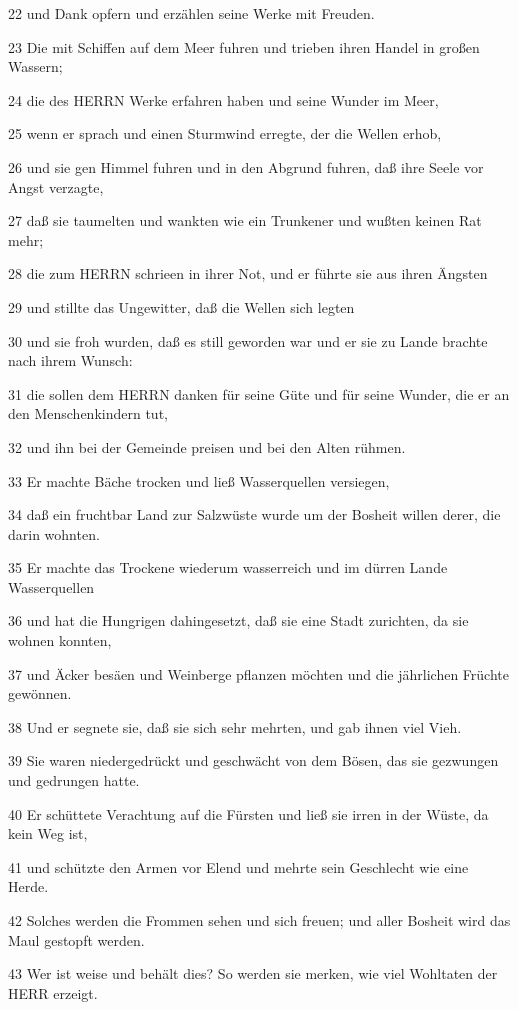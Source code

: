 \par 22 und Dank opfern und erzählen seine Werke mit Freuden.
\par 23 Die mit Schiffen auf dem Meer fuhren und trieben ihren Handel in großen Wassern;
\par 24 die des HERRN Werke erfahren haben und seine Wunder im Meer,
\par 25 wenn er sprach und einen Sturmwind erregte, der die Wellen erhob,
\par 26 und sie gen Himmel fuhren und in den Abgrund fuhren, daß ihre Seele vor Angst verzagte,
\par 27 daß sie taumelten und wankten wie ein Trunkener und wußten keinen Rat mehr;
\par 28 die zum HERRN schrieen in ihrer Not, und er führte sie aus ihren Ängsten
\par 29 und stillte das Ungewitter, daß die Wellen sich legten
\par 30 und sie froh wurden, daß es still geworden war und er sie zu Lande brachte nach ihrem Wunsch:
\par 31 die sollen dem HERRN danken für seine Güte und für seine Wunder, die er an den Menschenkindern tut,
\par 32 und ihn bei der Gemeinde preisen und bei den Alten rühmen.
\par 33 Er machte Bäche trocken und ließ Wasserquellen versiegen,
\par 34 daß ein fruchtbar Land zur Salzwüste wurde um der Bosheit willen derer, die darin wohnten.
\par 35 Er machte das Trockene wiederum wasserreich und im dürren Lande Wasserquellen
\par 36 und hat die Hungrigen dahingesetzt, daß sie eine Stadt zurichten, da sie wohnen konnten,
\par 37 und Äcker besäen und Weinberge pflanzen möchten und die jährlichen Früchte gewönnen.
\par 38 Und er segnete sie, daß sie sich sehr mehrten, und gab ihnen viel Vieh.
\par 39 Sie waren niedergedrückt und geschwächt von dem Bösen, das sie gezwungen und gedrungen hatte.
\par 40 Er schüttete Verachtung auf die Fürsten und ließ sie irren in der Wüste, da kein Weg ist,
\par 41 und schützte den Armen vor Elend und mehrte sein Geschlecht wie eine Herde.
\par 42 Solches werden die Frommen sehen und sich freuen; und aller Bosheit wird das Maul gestopft werden.
\par 43 Wer ist weise und behält dies? So werden sie merken, wie viel Wohltaten der HERR erzeigt.

